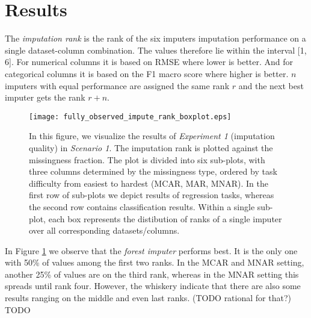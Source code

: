 \section{Results}
\label{sec:results}


The \textit{imputation rank} is the rank of the six imputers imputation performance on a single dataset-column combination. The values therefore lie within the interval [1, 6]. For numerical columns it is based on RMSE where lower is better. And for categorical columns it is based on the F1 macro score where higher is better. $n$ imputers with equal performance are assigned the same rank $r$ and the next best imputer gets the rank $r+n$.


\begin{figure}\centering
    \texttt{[image: fully\_observed\_impute\_rank\_boxplot.eps]}
    \caption[Scenario 1 Imputation Ranks]{In this figure, we visualize the results of \textit{Experiment 1} (imputation quality) in \textit{Scenario 1}. The imputation rank is plotted against the missingness fraction. The plot is divided into six sub-plots, with three columns determined by the missingness type, ordered by task difficulty from easiest to hardest (MCAR, MAR, MNAR). In the first row of sub-plots we depict results of regression tasks, whereas the second row contains classification results. Within a single sub-plot, each box represents the distibution of ranks of a single imputer over all corresponding datasets/columns.}\label{fig:fully_observed_impute_rank_boxplot}
\end{figure}

In Figure \ref{fig:fully_observed_impute_rank_boxplot} we observe that the \textit{forest imputer} performs best. It is the only one with 50\% of values among the first two ranks. In the MCAR and MNAR setting, another 25\% of values are on the third rank, whereas in the MNAR setting this spreads until rank four. However, the whiskery indicate that there are also some results ranging on the middle and even last ranks. (TODO rational for that?)
TODO

